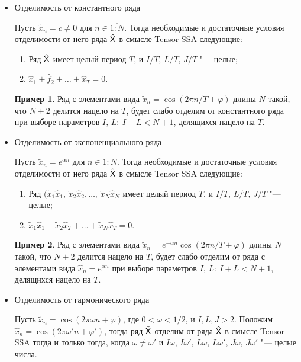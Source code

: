 \documentclass[specialist,
    substylefile = spbu_report.rtx,
    subf,href,colorlinks=true, 12pt]{disser}
\theoremstyle{plain}
\theoremstyle{definition}
\newtheorem{example}{Пример}[section]
\theoremstyle{remark}
\begin{document}
    \begin{itemize}
        \item Отделимость от константного ряда

        Пусть $\tilde{x}_n=c\ne 0$ для $n\in\overline{1:N}$.
        Тогда необходимые и достаточные условия отделимости от него ряда $\hat{\mathsf{X}}$ в смысле Tensor SSA следующие:
        \begin{enumerate}
            \item Ряд $\hat{\mathsf{X}}$ имеет целый период $T$, и $I/T$, $L/T$, $J/T$ "--- целые;
            \item $\hat{x}_{1}+\hat{f}_2+\ldots+\hat{x}_T=0$.
        \end{enumerate}
        \begin{example}
            Ряд с элементами вида $\tilde{x}_n=\cos(2\pi n / T + \varphi)$ длины $N$ такой, что $N+2$ делится нацело на
            $T$, будет слабо отделим от константного ряда при выборе параметров $I,\, L:\: I+L< N+1$, делящихся нацело на $T$.
        \end{example}
        \item Отделимость от экспоненциального ряда

        Пусть $\tilde{x}_n=e^{\alpha n}$ для $n\in\overline{1:N}$.
        Тогда необходимые и достаточные условия отделимости от него ряда $\hat{\mathsf{X}}$ в смысле Tensor SSA следующие:
        \begin{enumerate}
            \item Ряд $(\tilde{x}_{1}\hat{x}_{1},\, \tilde{x}_{2}\hat{x}_{2},\ldots,\, \tilde{x}_{N}\hat{x}_{N}$
            имеет целый период $T$, и $I/T$, $L/T$, $J/T$ "--- целые;
            \item $\tilde{x}_{1}\hat{x}_{1}+\tilde{x}_{2}\hat{x}_2+\ldots+\tilde{x}_{N}\hat{x}_T=0$.
        \end{enumerate}
        \begin{example}
            Ряд с элементами вида $\tilde{x}_n=e^{-\alpha n}\cos(2\pi n / T + \varphi)$ длины $N$ такой, что $N+2$ делится нацело на
            $T$, будет слабо отделим от ряда с элементами вида $\hat{x}_n=e^{\alpha n}$ при выборе параметров $I,\, L:\: I+L< N+1$, делящихся нацело на $T$.
        \end{example}
        \item Отделимость от гармонического ряда

        Пусть $\tilde{x}_n=\cos(2\pi \omega n + \varphi)$, где $0 < \omega < 1/2$, и $I, L, J > 2$.
        Положим $\hat{x}_n=\cos(2\pi \omega' n + \varphi')$,
        тогда ряд $\tilde{\mathsf{X}}$ отделим от ряда $\hat{\mathsf{X}}$ в смысле Tensor SSA тогда и только тогда, когда $\omega\ne\omega'$
        и $I\omega,\, I\omega',\, L\omega,\, L\omega',\, J\omega,\, J\omega'$ "--- целые числа.
    \end{itemize}
\end{document}
